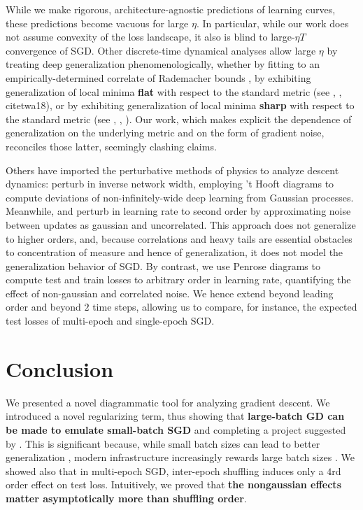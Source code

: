 \documentclass{article}
\begin{document}
    While we make rigorous, architecture-agnostic predictions of learning
    curves, these predictions become vacuous for large $\eta$.  In particular,
    while our work does not assume convexity of the loss landscape, it also is
    blind to large-$\eta T$ convergence of SGD.  Other discrete-time dynamical
    analyses allow large $\eta$ by treating deep generalization
    phenomenologically, whether by fitting to an empirically-determined
    correlate of Rademacher bounds \citep{li18}, by exhibiting generalization
    of local minima {\bf flat} with respect to the standard metric (see
    \citet{ho17}, \citet{ke17}, citet{wa18}), or by exhibiting generalization
    of local minima {\bf sharp} with respect to the standard metric (see
    \citet{st56}, \citet{di17}, \citet{wu18}).  Our work, which makes explicit
    the dependence of generalization on the underlying metric and on the form
    of gradient noise, reconciles those latter, seemingly clashing claims.
    
    Others have imported the perturbative methods of physics to analyze descent
    dynamics:  \citet{dy19} perturb in inverse network width, employing 't
    Hooft diagrams to compute deviations of non-infinitely-wide deep learning
    from Gaussian processes.  Meanwhile, \cite{ch18} and \citet{li17} perturb
    in learning rate to second order by approximating noise between updates as
    gaussian and uncorrelated.  This approach does not generalize to higher
    orders, and, because correlations and heavy tails are essential obstacles
    to concentration of measure and hence of generalization, it does not model
    the generalization behavior of SGD.  By contrast, we use Penrose diagrams
    to compute test and train losses to arbitrary order in learning rate,
    quantifying the effect of non-gaussian and correlated noise.  We hence
    extend \citet{ro18} beyond leading order and beyond $2$ time steps,
    allowing us to compare, for instance, the expected test losses of
    multi-epoch and single-epoch SGD.




\section{Conclusion}
    We presented a novel diagrammatic tool for analyzing gradient
    descent.  We introduced a novel regularizing term, thus showing that {\bf
    large-batch GD can be made to emulate small-batch SGD} and completing a
    project suggested by \citet{ro18}.  This is significant because, while
    small batch sizes can lead to better generalization \citep{bo91}, modern
    infrastructure increasingly rewards large batch sizes \citep{go18}.      
    We showed also that in multi-epoch SGD, inter-epoch shuffling induces only
    a $4$rd order effect on test loss.  Intuitively, we proved that {\bf the
    nongaussian effects matter asymptotically more than shuffling order}.
\end{document}
